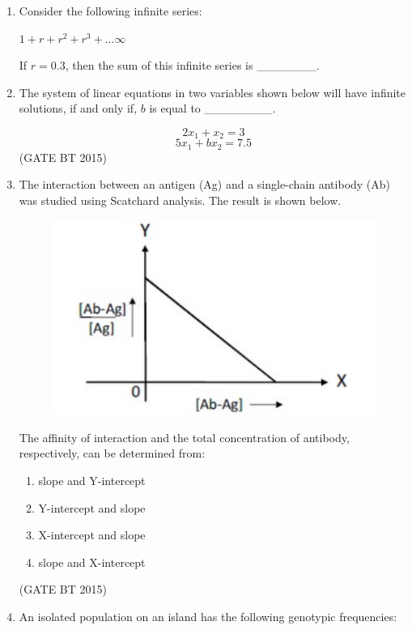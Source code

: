 \documentclass[journal,12pt,onecolumn]{IEEEtran}
\begin{document}
\begin{enumerate}[label=\textbf{Q.\arabic*}]
    \item Consider the following infinite series: 
    
\begin{center}
    $ 1 + r + r^2 + r^3 + \dots \infty $
\end{center}
    If $r = 0.3$, then the sum of this infinite series is \_\_\_\_\_\_\_.


    \item The system of linear equations in two variables shown below will have infinite solutions, if and only if, $b$ is equal to \_\_\_\_\_\_\_\_.

        \[
        2x_{1} + x_{2} = 3
        \]
        \[
        5x_{1} + bx_{2} = 7.5
        \]
         \hfill (GATE BT 2015)



\item The interaction between an antigen (Ag) and a single-chain antibody (Ab) was studied using Scatchard analysis. The result is shown below.

\begin{figure}[H]
    \centering
    \includegraphics[width=0.5\linewidth]{fig 6.png}
    \caption{}
    \label{fig:scatchard}
\end{figure}

The affinity of interaction and the total concentration of antibody, respectively, can be determined from:

\begin{multicols}{2}
\begin{enumerate}
    \item slope and Y-intercept
    \item Y-intercept and slope
    \item X-intercept and slope
    \item slope and X-intercept
\end{enumerate}
\end{multicols} \hfill (GATE BT 2015)


\item An isolated population on an island has the following genotypic frequencies:


\end{enumerate}
\end{document}
